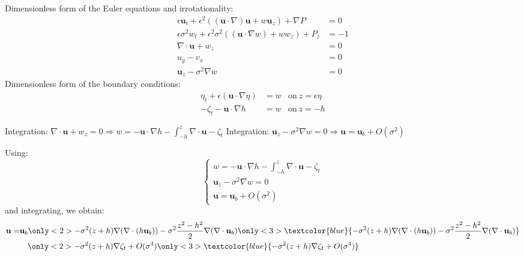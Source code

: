 \documentclass[compress,t]{beamer}
\begin{document}
			\begin{frame}
 				Dimensionless form of the Euler equations and irrotationality: 
				\begin{align*}
					\epsilon \mathbf{u}_t + \epsilon^2((\mathbf{u} \cdot \nabla) \mathbf{u} + w \mathbf{u}_z) + \nabla P & = 0\\
					\epsilon \sigma^2 w_t + \epsilon^2 \sigma^2 ((\mathbf{u} \cdot \nabla w) + w w_z) + P_z & = -1 \\
					\nabla \cdot \mathbf{u} + w_z & =  0 \\
					u_y-v_x & = 0 \\
					\mathbf{u}_z - \sigma^2 \nabla w & = 0
				\end{align*}
				Dimensionless form of the boundary conditions: 
				\begin{align*}
					\eta_t + \epsilon (\mathbf{u} \cdot \nabla \eta ) & = w & \mathrm{on} \: z = \epsilon \eta\\
					- \zeta_t - \mathbf{u} \cdot \nabla h & = w & \mathrm{on} \:  z = -h
				\end{align*}
 			\end{frame}
 	
 			\begin{frame}
 				Integration: $\displaystyle \nabla \cdot \mathbf{u} + w_z =  0 \Rightarrow w = -\mathbf{u} \cdot \nabla h - \int^z_{-h} \nabla \cdot \mathbf{u} - \zeta_t $
				Integration: $	\mathbf{u}_z - \sigma^2 \nabla w  = 0 \Rightarrow \mathbf{u} = \mathbf{u}_b + O(\sigma^2)$
				
				\pause
				Using:		
				\begin{equation*}
					\left\lbrace
						\begin{aligned}
							w = -\mathbf{u} \cdot \nabla h - \int^z_{-h} \nabla \cdot \mathbf{u} - \zeta_t \\
							\mathbf{u}_z - \sigma^2 \nabla w  = 0 \\
							\mathbf{u} = \mathbf{u}_b + O(\sigma^2)
						\end{aligned}
					\right.
				\end{equation*}
				and integrating, we obtain:
				\begin{align*}
					\mathbf{u} = & \mathbf{u}_b 
					\only<2>{- \sigma^2(z+h)\nabla (\nabla \cdot (h \mathbf{u}_b)) - \sigma^2 \frac{z^2-h^2}{2}\nabla ( \nabla \cdot \mathbf{u}_b)} 
					\only<3>{\textcolor{blue}{- \sigma^2(z+h)\nabla (\nabla \cdot (h \mathbf{u}_b)) - \sigma^2 \frac{z^2-h^2}{2}\nabla ( \nabla \cdot \mathbf{u}_b)}} \\
					& \quad 
					\only<2>{- \sigma^2(z+h)\nabla \zeta_t + O(\sigma^4)}
					\only<3>{\textcolor{blue}{- \sigma^2(z+h)\nabla \zeta_t + O(\sigma^4)}}
				\end{align*}
 			\end{frame}
 			
\end{document}
